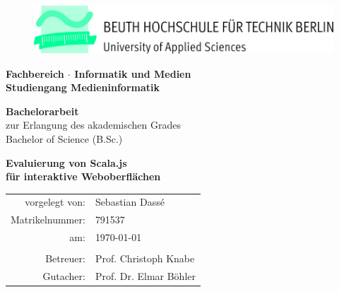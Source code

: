 \begin{titlepage}
\begin{center}
	\begin{figure}[!h]
		\includegraphics[scale=1]{./title/Beuth_Logo_horizontal.jpg}
	\end{figure}

	\vspace{15mm}

	\large
		\textbf{Fachbereich  $\cdot$ Informatik und Medien\\[3mm]
		Studiengang Medieninformatik}\\

	\vspace{15mm}

	\Large
		\textbf{Bachelorarbeit}\\[5mm]
	\normalsize
		zur Erlangung des akademischen Grades\\
		Bachelor of Science (B.Sc.)\\

	\vspace{15mm}

	\huge
		\textbf{Evaluierung von Scala.js \\
		für interaktive Weboberflächen }\\[2cm]
	

	\normalsize
	\begin{tabular}{rl}
		vorgelegt von: & Sebastian Dassé \\
		Matrikelnummer: & 791537 \\
		am: & \today \\
		& \\
		Betreuer: & Prof. Christoph Knabe\\
		Gutacher: & Prof. Dr. Elmar Böhler\\
	\end{tabular}\\
\end{center}
\end{titlepage}